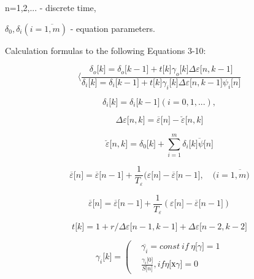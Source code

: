 n=1,2,... - discrete time,

\(\delta_{0},\delta_{i}(i = \overline{1,m})\) - equation parameters.

Calculation formulas to the following Equations 3-10:

\begin{equation}
\langle\frac{\delta_{o}\lbrack k\rbrack = \delta_{o}\lbrack k - 1\rbrack + t\lbrack k\rbrack\gamma_{o}\lbrack k\rbrack\Delta\varepsilon\lbrack n,k - 1\rbrack}{\delta_{i}\lbrack k\rbrack = \delta_{i}\lbrack k - 1\rbrack + t\lbrack k\rbrack\gamma_{i}\lbrack k\rbrack\Delta\varepsilon\lbrack n,k - 1\rbrack\psi_{i}\lbrack n\rbrack}
\end{equation}

\begin{equation}
\delta_{i}\lbrack k\rbrack = \delta_{i}\lbrack k - 1\rbrack(i = 0,1,...),
\end{equation}

\begin{equation}
\Delta\varepsilon\lbrack n,k\rbrack = \overline{\varepsilon}\lbrack n\rbrack - \breve{\varepsilon}\lbrack n,k\rbrack
\end{equation}

\begin{equation}
\breve{\varepsilon}\lbrack n,k\rbrack = \delta_{0}\lbrack k\rbrack + \sum_{i = 1}^{m}{\delta_{i}\lbrack k\overline{\rbrack\psi}\lbrack n\rbrack}
\end{equation}

\begin{equation}
\overline{\varepsilon}\lbrack n\rbrack = \overline{\varepsilon}\lbrack n - 1\rbrack + \frac{1}{T_{\varepsilon}}(\varepsilon\lbrack n\rbrack - \overline{\varepsilon}\lbrack n - 1\rbrack,\quad (i = \overline{1,m)}
\end{equation}

\begin{equation}
\overline{\varepsilon}\lbrack n\rbrack = \overline{\varepsilon}\lbrack n - 1\rbrack + \frac{1}{T_{\varepsilon}}(\varepsilon\lbrack n\rbrack - \overline{\varepsilon}\lbrack n - 1\rbrack)
\end{equation}

\begin{equation}
t\lbrack k\rbrack = 1 + r/\Delta\varepsilon\lbrack n - 1,k - 1\rbrack + \Delta\varepsilon\lbrack n - 2,k - 2\rbrack
\end{equation}

\begin{equation}
\gamma_{i}\lbrack k\rbrack = \left( \begin{aligned}
 & \overline{\gamma_{i}} = const\ if\ \eta\lbrack\gamma\rbrack = 1 \\
 & \frac{\gamma_{i}\lbrack 0\rbrack}{S\lbrack n\rbrack},if\eta\lbrack х\gamma\rbrack = 0
\end{aligned} \right.
\end{equation}

